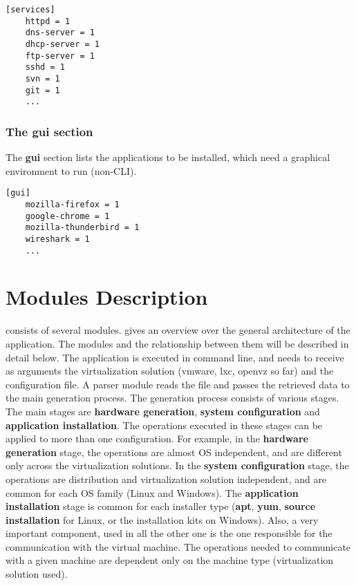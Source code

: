\lstset{caption=sample services section,label=lst:services-section}
\begin{lstlisting}
[services]
	httpd = 1
	dns-server = 1
	dhcp-server = 1
	ftp-server = 1
	sshd = 1
	svn = 1
	git = 1
	...
\end{lstlisting}


\subsubsection{The gui section}
\label{sub-sub-sec:gui-sec}
The \textbf{gui} section lists the applications to be installed, which need a
graphical environment to run (non-CLI).

\lstset{caption=sample gui section,label=lst:gui-section}
\begin{lstlisting}
[gui]
	mozilla-firefox = 1
	google-chrome = 1
	mozilla-thunderbird = 1
	wireshark = 1
	...
\end{lstlisting}

\section{Modules Description}
\label{sec:mod-desc}

\project consists of several modules. 
gives an overview over the general architecture of the application. The modules
and the relationship between them will be described in detail below.  The
application is executed in command line, and needs to receive as arguments the
virtualization solution (vmware, lxc, openvz so far) and the configuration
file. A parser module reads the file and passes the retrieved data to the main
generation process. The generation process consists of various stages. The
main stages are \textbf{hardware generation}, \textbf{system configuration} and
\textbf{application installation}. The operations executed in these stages can
be applied to more than one configuration. For example, in the \textbf{hardware
generation} stage, the operations are almost OS independent, and are different
only across the virtualization solutions. In the \textbf{system configuration}
stage, the operations are distribution and virtualization solution independent,
and are common for each OS family (Linux and Windows).  The \textbf{application
installation} stage is common for each installer type (\textbf{apt},
\textbf{yum}, \textbf{source installation} for Linux, or the installation kits
on Windows). Also, a very important component, used in all the other one is the
one responsible for the communication with the virtual machine. The operations
needed to communicate with a given machine are dependent only on the machine
type (virtualization solution used).

